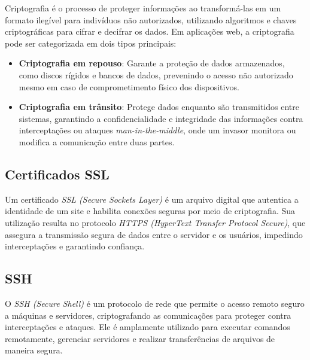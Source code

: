 
Criptografia é o processo de proteger informações ao transformá-las em um formato ilegível para indivíduos não autorizados, utilizando algoritmos e chaves criptográficas para cifrar e decifrar os dados. Em aplicações web, a criptografia pode ser categorizada em dois tipos principais:

\begin{itemize}
    \item \textbf{Criptografia em repouso}: Garante a proteção de dados armazenados, como discos rígidos e bancos de dados, prevenindo o acesso não autorizado mesmo em caso de comprometimento físico dos dispositivos.
    \item \textbf{Criptografia em trânsito}: Protege dados enquanto são transmitidos entre sistemas, garantindo a confidencialidade e integridade das informações contra interceptações ou ataques \emph{man-in-the-middle}, onde um invasor monitora ou modifica a comunicação entre duas partes.
\end{itemize}

\subsection{Certificados SSL}


Um certificado \emph{SSL (Secure Sockets Layer)} é um arquivo digital que autentica a identidade de um site e habilita conexões seguras por meio de criptografia. Sua utilização resulta no protocolo \emph{HTTPS (HyperText Transfer Protocol Secure)}, que assegura a transmissão segura de dados entre o servidor e os usuários, impedindo interceptações e garantindo confiança.

\subsection{SSH}


O \emph{SSH (Secure Shell)} é um protocolo de rede que permite o acesso remoto seguro a máquinas e servidores, criptografando as comunicações para proteger contra interceptações e ataques. Ele é amplamente utilizado para executar comandos remotamente, gerenciar servidores e realizar transferências de arquivos de maneira segura.


